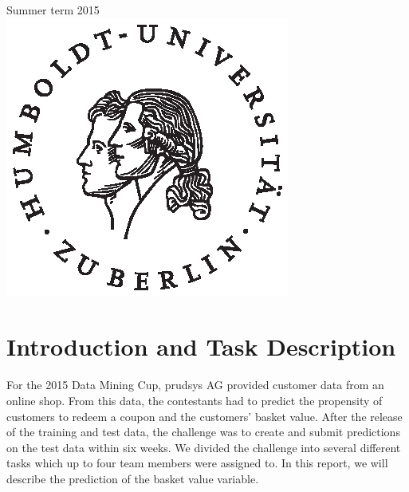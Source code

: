 \begin{titlepage}

{\large Summer term 2015 }\\[1cm] %


\includegraphics{husiegel_sw_op.eps}\\[1cm] %
 

\vfill %

\end{titlepage}

\tableofcontents
\newpage

\section{Introduction and Task Description}

For the 2015 Data Mining Cup, prudsys AG provided customer data from an online shop. From this data, the contestants had to predict the propensity of customers to redeem a coupon and the customers' basket value. After the release of the training and test data, the challenge was to create and submit predictions on the test data within six weeks. We divided the challenge into several different tasks which up to four team members were assigned to. In this report, we will describe the prediction of the basket value variable.\\ 

